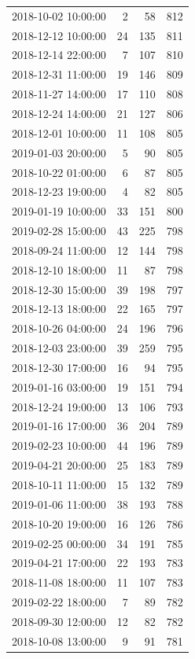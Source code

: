 \begin{tabular}{lrrr}
2018-10-02 10:00:00 & 2 & 58 & 812 \\
2018-12-12 10:00:00 & 24 & 135 & 811 \\
2018-12-14 22:00:00 & 7 & 107 & 810 \\
2018-12-31 11:00:00 & 19 & 146 & 809 \\
2018-11-27 14:00:00 & 17 & 110 & 808 \\
2018-12-24 14:00:00 & 21 & 127 & 806 \\
2018-12-01 10:00:00 & 11 & 108 & 805 \\
2019-01-03 20:00:00 & 5 & 90 & 805 \\
2018-10-22 01:00:00 & 6 & 87 & 805 \\
2018-12-23 19:00:00 & 4 & 82 & 805 \\
2019-01-19 10:00:00 & 33 & 151 & 800 \\
2019-02-28 15:00:00 & 43 & 225 & 798 \\
2018-09-24 11:00:00 & 12 & 144 & 798 \\
2018-12-10 18:00:00 & 11 & 87 & 798 \\
2018-12-30 15:00:00 & 39 & 198 & 797 \\
2018-12-13 18:00:00 & 22 & 165 & 797 \\
2018-10-26 04:00:00 & 24 & 196 & 796 \\
2018-12-03 23:00:00 & 39 & 259 & 795 \\
2018-12-30 17:00:00 & 16 & 94 & 795 \\
2019-01-16 03:00:00 & 19 & 151 & 794 \\
2018-12-24 19:00:00 & 13 & 106 & 793 \\
2019-01-16 17:00:00 & 36 & 204 & 789 \\
2019-02-23 10:00:00 & 44 & 196 & 789 \\
2019-04-21 20:00:00 & 25 & 183 & 789 \\
2018-10-11 11:00:00 & 15 & 132 & 789 \\
2019-01-06 11:00:00 & 38 & 193 & 788 \\
2018-10-20 19:00:00 & 16 & 126 & 786 \\
2019-02-25 00:00:00 & 34 & 191 & 785 \\
2019-04-21 17:00:00 & 22 & 193 & 783 \\
2018-11-08 18:00:00 & 11 & 107 & 783 \\
2019-02-22 18:00:00 & 7 & 89 & 782 \\
2018-09-30 12:00:00 & 12 & 82 & 782 \\
2018-10-08 13:00:00 & 9 & 91 & 781 \\

\end{tabular}
